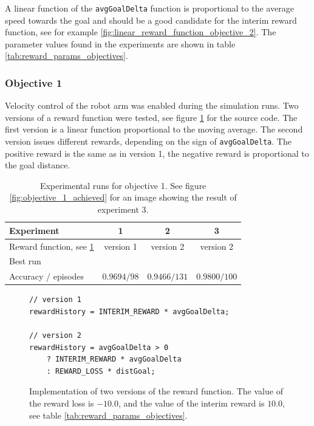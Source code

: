 \documentclass[11pt, onecolumn, oneside, reqno]{amsart}
\begin{document}
A linear function of the \texttt{avgGoalDelta} function is proportional to the average speed towards the goal and should be a good candidate for the interim reward function, see for example \ref{fig:linear_reward_function_objective_2}. The parameter values found in the experiments are shown in table \ref{tab:reward_params_objectives}.

\subsubsection{Objective 1}
Velocity control of the robot arm was enabled during the simulation runs. Two versions of a reward function were tested, see  figure \ref{fig:reward_functions_objective_1} for the source code. The first version is a linear function proportional to the moving average. The second version issues different rewards, depending on the sign of \texttt{avgGoalDelta}. The positive reward is the same as in version 1, the negative reward is proportional to the goal distance.  

\begin{table}[thpb]
	\centering
	\renewcommand{\arraystretch}{1.3}
	\begin{tabular}{|l|c|c|c|}
	\hline
	Experiment & 1 & 2 & 3 \\
	\hline
	Reward function, see \ref{fig:reward_functions_objective_1}  & version 1 &  version 2 &  version 2 \\
	\hline
	\multicolumn{4}{|l|}{Best run} \\ 
	\hline
	Accuracy / episodes & $0.9694 / 98$ & $0.9466 / 131$ & $0.9800 / 100$ \\
	\hline
	\end{tabular}
	\caption{Experimental runs for objective 1. See figure \ref{fig:objective_1_achieved} for an image showing the result of experiment 3.}
	\label{tab:experiments_objective_1}
\end{table}

\begin{figure}[htpb]
\centering
\begin{lstlisting}
// version 1
rewardHistory = INTERIM_REWARD * avgGoalDelta;

// version 2
rewardHistory = avgGoalDelta > 0 
	? INTERIM_REWARD * avgGoalDelta
	: REWARD_LOSS * distGoal;
\end{lstlisting}
\caption{Implementation of two versions of the reward function. The value of the reward loss is $-10.0$, and the value of the interim reward is $10.0$, see table \ref{tab:reward_params_objectives}.}
\label{fig:reward_functions_objective_1}
\end{figure}
\end{document}
